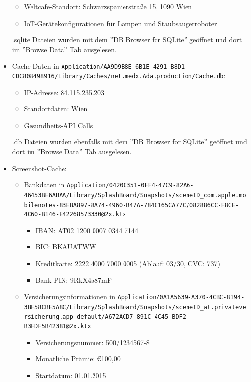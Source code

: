 \documentclass[12pt, a4paper, titlepage, oneside]{scrartcl}
\begin{document}
\begin{itemize}
\begin{itemize}
				\item Weltcafe-Standort: Schwarzspanierstraße 15, 1090 Wien

				\item IoT-Gerätekonfigurationen für Lampen und Staubsaugerroboter
			\end{itemize}

			.sqlite Dateien wurden mit dem ''DB Browser for SQLite'' geöffnet und dort
			im ''Browse Data'' Tab ausgelesen.

		\item Cache-Daten in \lstinline{Application/AA9D9B8E-6B1E-4291-B8D1-CDC808498916/Library/Caches/net.medx.Ada.production/Cache.db}:
			\begin{itemize}
				\item IP-Adresse: 84.115.235.203

				\item Standortdaten: Wien

				\item Gesundheits-API Calls
			\end{itemize}

			.db Dateien wurden ebenfalls mit dem ''DB Browser for SQLite'' geöffnet und
			dort im ''Browse Data'' Tab ausgelesen.

		\item Screenshot-Cache:
			\begin{itemize}
				\item Bankdaten in \lstinline{Application/0420C351-0FF4-47C9-82A6-46453BE6ABAA/Library/SplashBoard/Snapshots/sceneID_com.apple.mobilenotes-83EBA897-8A74-4960-B47A-784C165CA77C/082886CC-F8CE-4C60-B146-E42268573330@2x.ktx}
					\begin{itemize}
						\item IBAN: AT02 1200 0007 0344 7144

						\item BIC: BKAUATWW

						\item Kreditkarte: 2222 4000 7000 0005 (Ablauf: 03/30, CVC: 737)

						\item Bank-PIN: 9RkX4a87mF
					\end{itemize}

				\item Versicherungsinformationen in \lstinline{Application/0A1A5639-A370-4CBC-8194-3BF58CBE5A8C/Library/SplashBoard/Snapshots/sceneID_at.privateversicherung.app-default/A672ACD7-891C-4C45-BDF2-B3FDF5B42381@2x.ktx}
					\begin{itemize}
						\item Versicherungsnummer: 500/1234567-8

						\item Monatliche Prämie: €100,00

						\item Startdatum: 01.01.2015
					\end{itemize}
			\end{itemize}
	\end{itemize}
\end{document}
